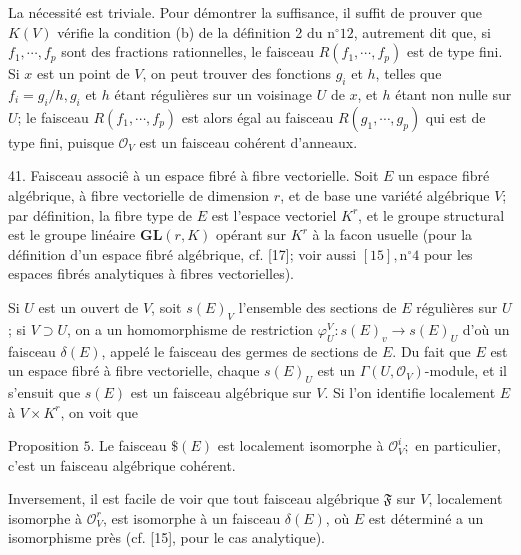 La nécessité est triviale. Pour démontrer la suffisance, il suffit de prouver que $K(V)$ vérifie la condition (b) de la définition 2 du $\mathrm{n}^{\circ} 12$, autrement dit que, si $f_{1}, \cdots, f_{p}$ sont des fractions rationnelles, le faisceau $R\left(f_{1}, \cdots, f_{p}\right)$ est de type fini. Si $x$ est un point de $V$, on peut trouver des fonctions $g_{i}$ et $h$, telles que $f_{i}=g_{i} / h, g_{i}$ et $h$ étant régulières sur un voisinage $U$ de $x$, et $h$ étant non nulle sur $U$; le faisceau $R\left(f_{1}, \cdots, f_{p}\right)$ est alors égal au faisceau $R\left(g_{1}, \cdots, g_{p}\right)$ qui est de type fini, puisque $\mathcal{O}_{V}$ est un faisceau cohérent d'anneaux.

41. Faisceau associê à un espace fibré à fibre vectorielle. Soit $E$ un espace fibré algébrique, à fibre vectorielle de dimension $r$, et de base une variété algébrique $V$; par définition, la fibre type de $E$ est l'espace vectoriel $K^{r}$, et le groupe structural est le groupe linéaire $\mathbf{G L}(r, K)$ opérant sur $K^{r}$ à la facon usuelle (pour la définition d'un espace fibré algébrique, cf. [17]; voir aussi $[15], \mathrm{n}^{\circ} 4$ pour les espaces fibrés analytiques à fibres vectorielles).

Si $U$ est un ouvert de $V$, soit $s(E)_{V}$ l'ensemble des sections de $E$ régulières sur $U$; si $V \supset U$, on a un homomorphisme de restriction $\varphi_{U}^{V}: s(E)_{v} \rightarrow s(E)_{U}$ d'où un faisceau $\delta(E)$, appelé le faisceau des germes de sections de $E .$ Du fait que $E$ est un espace fibré à fibre vectorielle, chaque $s(E)_{U}$ est un $\Gamma\left(U, \mathcal{O}_{V}\right)$-module, et il s'ensuit que $s(E)$ est un faisceau algébrique sur $V$. Si l'on identifie localement $E$ à $V \times K^{r}$, on voit que

Proposition $5 .$ Le faisceau $\$(E)$ est localement isomorphe à $\mathcal{O}_{V}^{i} ;$ en particulier, c'est un faisceau algébrique cohérent.

Inversement, il est facile de voir que tout faisceau algébrique $\mathfrak{F}$ sur $V$, localement isomorphe à $\mathcal{O}_{V}^{r}$, est isomorphe à un faisceau $\delta(E)$, où $E$ est déterminé a un isomorphisme près (cf. [15], pour le cas analytique).

